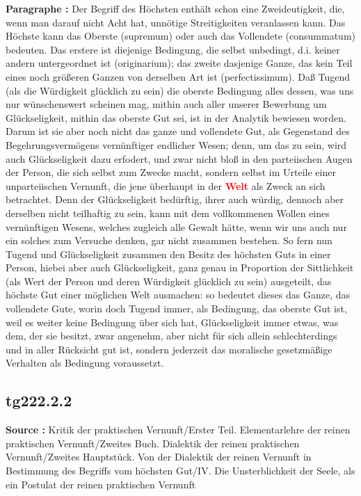 \documentclass[a4paper,12pt,twoside]{book}
\newcommand{\match}[1]{\textcolor{red}{\textbf{#1}}}
\begin{document}
	\noindent\textbf{Paragraphe : }Der Begriff des Höchsten enthält schon eine Zweideutigkeit, die, wenn man darauf nicht Acht hat, unnötige Streitigkeiten veranlassen kann. Das Höchste kann das Oberste (supremum) oder auch das Vollendete (consummatum) bedeuten. Das erstere ist diejenige Bedingung, die selbst unbedingt, d.i. keiner andern untergeordnet ist (originarium); das zweite dasjenige Ganze, das kein Teil eines noch größeren Ganzen von derselben Art ist (perfectissimum). Daß Tugend (als die Würdigkeit glücklich zu sein) die oberste Bedingung alles dessen, was uns nur wünschenswert scheinen mag, mithin auch aller unserer Bewerbung um Glückseligkeit, mithin das oberste Gut sei, ist in der Analytik bewiesen worden. Darum ist sie aber noch nicht das ganze und vollendete Gut, als Gegenstand des Begehrungsvermögens vernünftiger endlicher Wesen; denn, um das zu sein, wird auch Glückseligkeit dazu erfodert, und zwar nicht bloß in den parteiischen Augen der Person, die sich selbst zum Zwecke macht, sondern selbst im Urteile einer unparteiischen Vernunft, die jene überhaupt in der \match{Welt} als Zweck an sich betrachtet. Denn der Glückseligkeit bedürftig, ihrer auch würdig, dennoch aber derselben nicht teilhaftig zu sein, kann mit dem vollkommenen Wollen eines vernünftigen Wesens, welches zugleich alle Gewalt hätte, wenn wir uns auch nur ein solches zum Versuche denken, gar nicht zusammen bestehen. So fern nun Tugend  und Glückseligkeit zusammen den Besitz des höchsten Guts in einer Person, hiebei aber auch Glückseligkeit, ganz genau in Proportion der Sittlichkeit (als Wert der Person und deren Würdigkeit glücklich zu sein) ausgeteilt, das höchste Gut einer möglichen Welt ausmachen: so bedeutet dieses das Ganze, das vollendete Gute, worin doch Tugend immer, als Bedingung, das oberste Gut ist, weil es weiter keine Bedingung über sich hat, Glückseligkeit immer etwas, was dem, der sie besitzt, zwar angenehm, aber nicht für sich allein schlechterdings und in aller Rücksicht gut ist, sondern jederzeit das moralische gesetzmäßige Verhalten als Bedingung voraussetzt. 
	
	\subsection*{tg222.2.2} 
	\textbf{Source : }Kritik der praktischen Vernunft/Erster Teil. Elementarlehre der reinen praktischen Vernunft/Zweites Buch. Dialektik der reinen praktischen Vernunft/Zweites Hauptstück. Von der Dialektik der reinen Vernunft in Bestimmung des Begriffs vom höchsten Gut/IV. Die Unsterblichkeit der Seele, als ein Postulat der reinen praktischen Vernunft\\  
	
\end{document}

